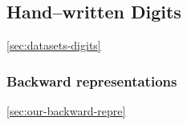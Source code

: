 
\subsection{Hand--written Digits} 
\label{sec:tlr-digits} 

\ref{sec:datasets-digits} 

\subsubsection{Backward representations} 
\ref{sec:our-backward-repre} 
